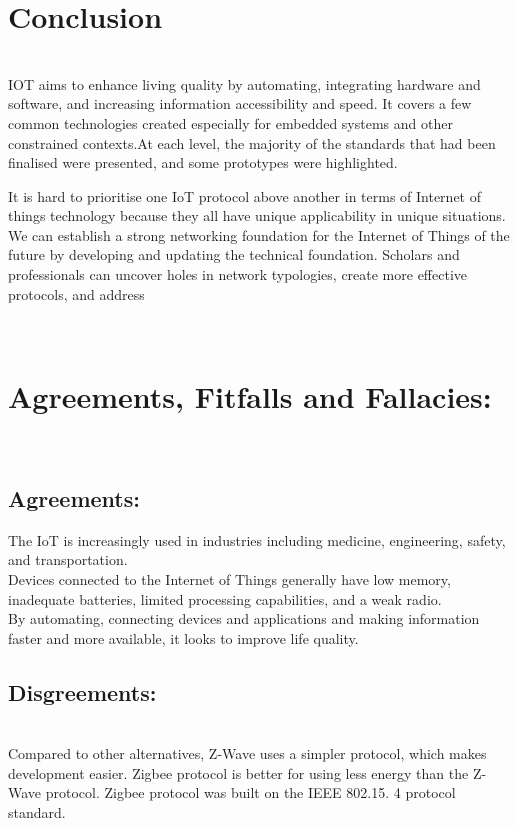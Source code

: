 \documentclass{article}
\begin{document}
\section{Conclusion}
\\
IOT aims to enhance living quality by automating, integrating hardware and software, and increasing information accessibility and speed. It covers a few common technologies created especially for embedded systems and other constrained contexts.At each level, the majority of the standards that had been finalised were presented, and some prototypes were highlighted.

 It is hard to prioritise one IoT protocol above another in terms of Internet of things technology because they all have unique applicability in unique situations. We can establish a strong networking foundation for the Internet of Things of the future by developing and updating the technical foundation. Scholars and professionals can uncover holes in network typologies, create more effective protocols, and address

\\
\section{Agreements, Fitfalls and Fallacies:}
\\
\subsection{Agreements:}
    The IoT is increasingly used in industries including medicine, engineering, safety, and transportation.
    \\
    Devices connected to the Internet of Things generally have low memory, inadequate batteries, limited processing capabilities, and a weak radio.
    \\
    By automating, connecting devices and applications and making information faster and more available, it looks to improve life quality.   
\\

\subsection{Disgreements:}
\\
Compared to other alternatives, Z-Wave uses a simpler protocol, which makes development easier. 
Zigbee protocol is better for using less energy than the Z-Wave protocol. Zigbee protocol was built on the IEEE 802.15. 4 protocol standard.
\\
\end{document}
